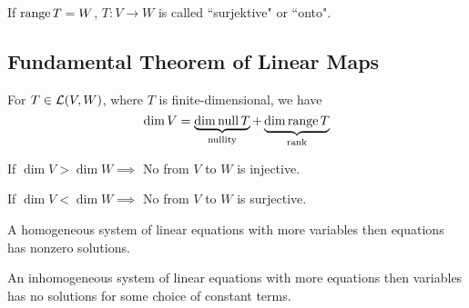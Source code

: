 \setcounter{thm}{18}
\begin{mydef}
  If $\operatorname{range} T=W$, $T:V\to W$ is called ``surjektive" or ``onto".
\end{mydef}

\subsection{Fundamental Theorem of Linear Maps}
  \setcounter{thm}{20}
  \begin{thm} 
    \label{rank-nullity-theorem}
    For $T \in {\mathcal{L}(V,W)}$, where $T$ is finite-dimensional, we have
    \begin{equation}
      \dim V =
      \underbrace{ \dim \operatorname{null} T }_{\text{nullity}}
      + \underbrace{\dim \operatorname{range} T}_{\text{rank}}
    \end{equation}
  \end{thm}

  \setcounter{thm}{21}
  \begin{thm}
    If $\dim V > \dim W \implies$ No \lm from $V$ to $W$ is injective.
  \end{thm}

  \setcounter{thm}{23}
  \begin{thm}
    If $\dim V < \dim W \implies$ No \lm from $V$ to $W$ is surjective.
  \end{thm}

  \setcounter{thm}{25}
  \begin{thm}
    A homogeneous system of linear equations with more variables then equations has nonzero solutions.
  \end{thm}

  \setcounter{thm}{27}
  \begin{thm}
    An inhomogeneous system of linear equations with more equations then variables has no solutions for some choice of constant terms.
  \end{thm}
